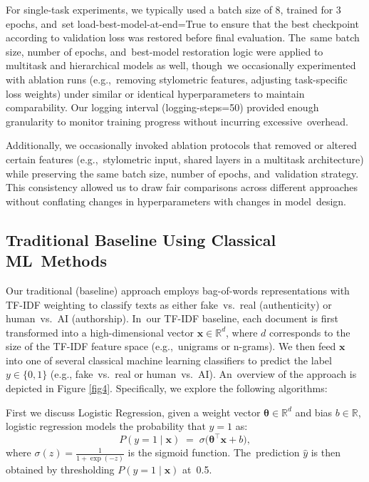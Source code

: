 \documentclass[electronics,article,accept,pdftex,moreauthors,electronics]{Definitions/mdpi}
\begin{document}
For single-task experiments, we typically used a batch size of 8, trained for 3 epochs, and~set load-best-model-at-end=True to ensure that the best checkpoint according to validation loss was restored before final evaluation. The~same batch size, number of epochs, and~best-model restoration logic were applied to multitask and hierarchical models as well, though~we occasionally experimented with ablation runs (e.g.,~removing stylometric features, adjusting task-specific loss weights) under similar or identical hyperparameters to maintain comparability. Our logging interval (logging-steps=50) provided enough granularity to monitor training progress without incurring excessive~overhead.

Additionally, we occasionally invoked ablation protocols that removed or altered certain features (e.g.,~stylometric input, shared layers in a multitask architecture) while preserving the same batch size, number of epochs, and~validation strategy. This consistency allowed us to draw fair comparisons across different approaches without conflating changes in hyperparameters with changes in model~design.


\subsection{Traditional Baseline Using Classical ML~Methods}

Our traditional (baseline) approach employs bag-of-words representations with TF-IDF weighting to classify texts as either fake~vs.~real (authenticity) or human~vs.~AI (authorship). In~our TF-IDF baseline, each document is first transformed into a high-dimensional vector 
$\mathbf{x} \in \mathbb{R}^d$, where $d$ corresponds to the size of the TF-IDF feature space 
(e.g.,~unigrams or n-grams). We then feed $\mathbf{x}$ into one of several classical machine learning classifiers to predict the label $y \in \{0,1\}$ (e.g., fake~vs.~real or human~vs.~AI). An~overview of the approach is depicted in Figure \ref{fig4}.
Specifically, we explore the following algorithms:

First we discuss Logistic Regression, given a weight vector $\boldsymbol{\theta} \in \mathbb{R}^d$ and bias $b \in \mathbb{R}$, 
logistic regression models the probability that $y=1$ as:
\begin{equation}
\label{eq:logistic}
P(y=1 \mid \mathbf{x}) \;=\; \sigma\big(\boldsymbol{\theta}^\top \mathbf{x} + b\big),
\end{equation}
where $\sigma(z) = \tfrac{1}{1 + \exp(-z)}$ is the sigmoid function. The~prediction 
$\hat{y}$ is then obtained by thresholding $P(y=1 \mid \mathbf{x})$ at~0.5.
\end{document}
